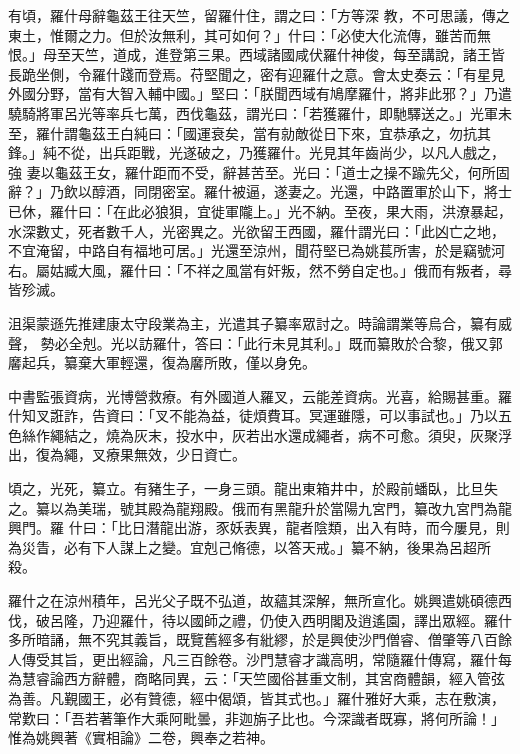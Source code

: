 \begin{pinyinscope}
 有頃，羅什母辭龜茲王往天竺，留羅什住，謂之曰：「方等深
 教，不可思議，傳之東土，惟爾之力。但於汝無利，其可如何？」什曰：「必使大化流傳，雖苦而無恨。」母至天竺，道成，進登第三果。西域諸國咸伏羅什神俊，每至講說，諸王皆長跪坐側，令羅什踐而登焉。苻堅聞之，密有迎羅什之意。會太史奏云：「有星見外國分野，當有大智入輔中國。」堅曰：「朕聞西域有鳩摩羅什，將非此邪？」乃遣驍騎將軍呂光等率兵七萬，西伐龜茲，謂光曰：「若獲羅什，即馳驛送之。」光軍未至，羅什謂龜茲王白純曰：「國運衰矣，當有勍敵從日下來，宜恭承之，勿抗其鋒。」純不從，出兵距戰，光遂破之，乃獲羅什。光見其年齒尚少，以凡人戲之，強
 妻以龜茲王女，羅什距而不受，辭甚苦至。光曰：「道士之操不踰先父，何所固辭？」乃飲以醇酒，同閉密室。羅什被逼，遂妻之。光還，中路置軍於山下，將士已休，羅什曰：「在此必狼狽，宜徙軍隴上。」光不納。至夜，果大雨，洪潦暴起，水深數丈，死者數千人，光密異之。光欲留王西國，羅什謂光曰：「此凶亡之地，不宜淹留，中路自有福地可居。」光還至涼州，聞苻堅已為姚萇所害，於是竊號河右。屬姑臧大風，羅什曰：「不祥之風當有奸叛，然不勞自定也。」俄而有叛者，尋皆殄滅。



 沮渠蒙遜先推建康太守段業為主，光遣其子纂率眾討之。時論謂業等烏合，纂有威聲，
 勢必全剋。光以訪羅什，答曰：「此行未見其利。」既而纂敗於合黎，俄又郭黁起兵，纂棄大軍輕還，復為黁所敗，僅以身免。



 中書監張資病，光博營救療。有外國道人羅叉，云能差資病。光喜，給賜甚重。羅什知叉誑詐，告資曰：「叉不能為益，徒煩費耳。冥運雖隱，可以事試也。」乃以五色絲作繩結之，燒為灰末，投水中，灰若出水還成繩者，病不可愈。須臾，灰聚浮出，復為繩，叉療果無效，少日資亡。



 頃之，光死，纂立。有豬生子，一身三頭。龍出東箱井中，於殿前蟠臥，比旦失之。纂以為美瑞，號其殿為龍翔殿。俄而有黑龍升於當陽九宮門，纂改九宮門為龍興門。羅
 什曰：「比日潛龍出游，豕妖表異，龍者陰類，出入有時，而今屢見，則為災眚，必有下人謀上之變。宜剋己脩德，以答天戒。」纂不納，後果為呂超所殺。



 羅什之在涼州積年，呂光父子既不弘道，故蘊其深解，無所宣化。姚興遣姚碩德西伐，破呂隆，乃迎羅什，待以國師之禮，仍使入西明閣及逍遙園，譯出眾經。羅什多所暗誦，無不究其義旨，既覽舊經多有紕繆，於是興使沙門僧睿、僧肇等八百餘人傳受其旨，更出經論，凡三百餘卷。沙門慧睿才識高明，常隨羅什傳寫，羅什每為慧睿論西方辭體，商略同異，云：「天竺國俗甚重文制，其宮商體韻，經入管弦
 為善。凡覲國王，必有贊德，經中偈頌，皆其式也。」羅什雅好大乘，志在敷演，常歎曰：「吾若著筆作大乘阿毗曇，非迦旃子比也。今深識者既寡，將何所論！」惟為姚興著《實相論》二卷，興奉之若神。




\end{pinyinscope}
